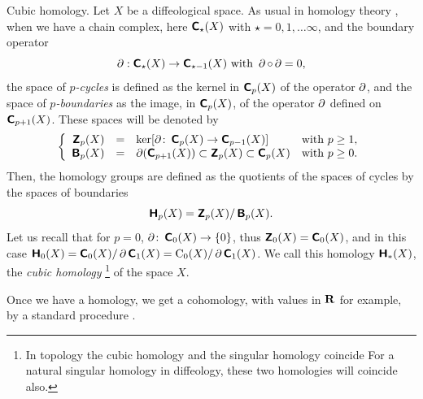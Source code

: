 \begin{Article}{Cubic homology.}{}
  \label{Cubic-homology}
  Let $X$ be a diffeological space.
  As usual in homology theory \cite{McL75},
  when we have a chain complex,
  here $\operatorname{\textbf{\textsf C}}_{\star}(X)$ with $\star = 0,1, \ldots \infty$,
  and the boundary operator
  $$%
    \Boundary: \QDChains{\star}(X) \to \QDChains{\star-1}(X) \SpacedText{with} \Boundary \circ \Boundary = 0,
  $$%
  the space of \emph{$p$-cycles} is defined as the kernel in $\operatorname{\textbf{\textsf C}}_{p}(X)$ of the operator $\operatorname{\partial}$,
  and the space of \emph{$p$-boundaries} as the image,
  in $\operatorname{\textbf{\textsf C}}_{p}(X)$,
  of the operator $\operatorname{\partial}$ defined on $\operatorname{\textbf{\textsf C}}_{p+1}(X)$.
  These spaces will be denoted by
  $$%
    \left\{
    \begin{array}{rcll}
    \QDZ_p(X) & = &\ker[\Boundary \colon \QDChains{p}(X) \to
    \QDChains{p-1}(X)] & \mbox{with $p \geq 1$}, \\
    \QDB_p(X) & = & \Boundary (\QDChains{p+1}(X))\subset
    \QDZ_p(X) \subset \QDChains{p}(X) & \mbox{with $p \geq 0$.}
    \end{array}
    \right.
  $$%
  Then,
  the homology groups are defined as the quotients of the spaces of cycles by the spaces of boundaries
  $$%
    \QDH_p(X) = \QDZ_p(X)/\QDB_p(X).
  $$%
  Let us recall that for $p = 0$,
  $\operatorname{\partial} \colon \operatorname{\textbf{\textsf C}}_{0}(X) \to \{0\}$,
  thus $\operatorname{\textbf{\textsf Z}}_0(X) = \operatorname{\textbf{\textsf C}}_{0}(X)$,
  and in this case $\operatorname{\textbf{\textsf H}}_0(X) =  \operatorname{\textbf{\textsf C}}_{0}(X)/\operatorname{\partial} \operatorname{\textbf{\textsf C}}_{1}(X) = \operatorname{C}_{0}(X)/\operatorname{\partial} \operatorname{\textbf{\textsf C}}_{1}(X)$.
  We call this homology $\operatorname{\textbf{\textsf H}}_*(X)$,
  the \emph{cubic homology}%
  \footnote{In topology the cubic homology and the singular homology coincide \cite[Ex. 8.1]{HY61}
  For a natural singular homology in diffeology,
  these two homologies will coincide also.}
  of the space $X$.

  Once we have a homology,
  we get a cohomology,
  with values in $\mathbf{R}$ for example,
  by a standard procedure \cite[\textsection\,6.63]{PIZ13}.


\end{Article}
